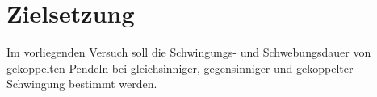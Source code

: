 \section{Zielsetzung}
\label{sec:Zielsetzung}
Im vorliegenden Versuch soll die Schwingungs- und Schwebungsdauer von gekoppelten Pendeln bei gleichsinniger, gegensinniger und gekoppelter Schwingung bestimmt werden.
 
